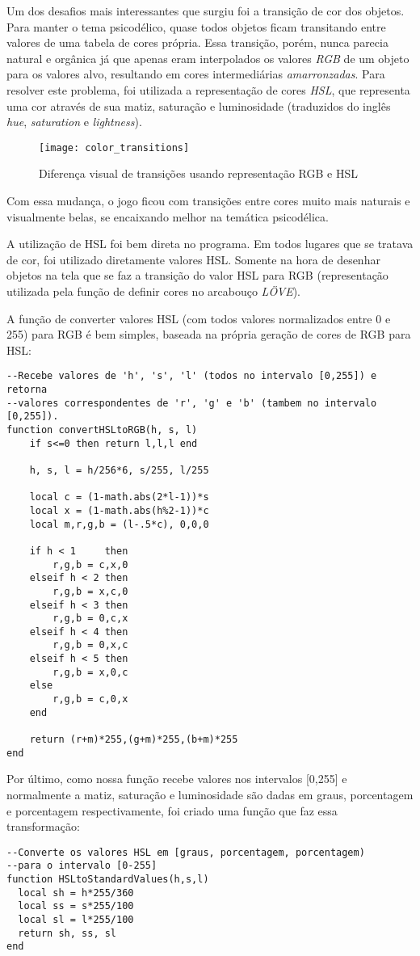 Um dos desafios mais interessantes que surgiu foi a transição de cor dos objetos. Para manter o tema psicodélico, quase todos objetos ficam transitando entre valores de uma tabela de cores própria. Essa transição, porém, nunca parecia natural e orgânica já que apenas eram interpolados os valores \textit{RGB} de um objeto para os valores alvo, resultando em cores intermediárias \textit{amarronzadas}. Para resolver este problema, foi utilizada a representação de cores \textit{HSL}, que representa uma cor através de sua matiz, saturação e luminosidade (traduzidos do inglês \textit{hue}, \textit{saturation} e \textit{lightness}).

\begin{figure}[h!]
\texttt{[image: color\_transitions]}
\centering
\caption{Diferença visual de transições usando representação RGB e HSL}
\end{figure}

Com essa mudança, o jogo ficou com transições entre cores muito mais naturais e visualmente belas, se encaixando melhor na temática psicodélica.

A utilização de HSL foi bem direta no programa. Em todos lugares que se tratava de cor, foi utilizado diretamente valores HSL. Somente na hora de desenhar objetos na tela que se faz a transição do valor HSL para RGB (representação utilizada pela função de definir cores no arcabouço \textit{LÖVE}).

A função de converter valores HSL (com todos valores normalizados entre 0 e 255) para RGB é bem simples, baseada na própria geração de cores de RGB para HSL:

\begin{lstlisting}[language={[5.0]lua}]
--Recebe valores de 'h', 's', 'l' (todos no intervalo [0,255]) e retorna
--valores correspondentes de 'r', 'g' e 'b' (tambem no intervalo [0,255]).
function convertHSLtoRGB(h, s, l)
	if s<=0 then return l,l,l end

	h, s, l = h/256*6, s/255, l/255

	local c = (1-math.abs(2*l-1))*s
	local x = (1-math.abs(h%2-1))*c
	local m,r,g,b = (l-.5*c), 0,0,0

	if h < 1     then
		r,g,b = c,x,0
	elseif h < 2 then
	 	r,g,b = x,c,0
	elseif h < 3 then
	 	r,g,b = 0,c,x
	elseif h < 4 then
	 	r,g,b = 0,x,c
	elseif h < 5 then
	 	r,g,b = x,0,c
	else
	 	r,g,b = c,0,x
	end

	return (r+m)*255,(g+m)*255,(b+m)*255
end
\end{lstlisting}

Por último, como nossa função recebe valores nos intervalos [0,255] e normalmente a matiz, saturação e luminosidade são dadas em graus, porcentagem e porcentagem respectivamente, foi criado uma função que faz essa transformação:

\begin{lstlisting}[language={[5.0]lua}]
--Converte os valores HSL em [graus, porcentagem, porcentagem)
--para o intervalo [0-255]
function HSLtoStandardValues(h,s,l)
  local sh = h*255/360
  local ss = s*255/100
  local sl = l*255/100
  return sh, ss, sl
end
\end{lstlisting}
